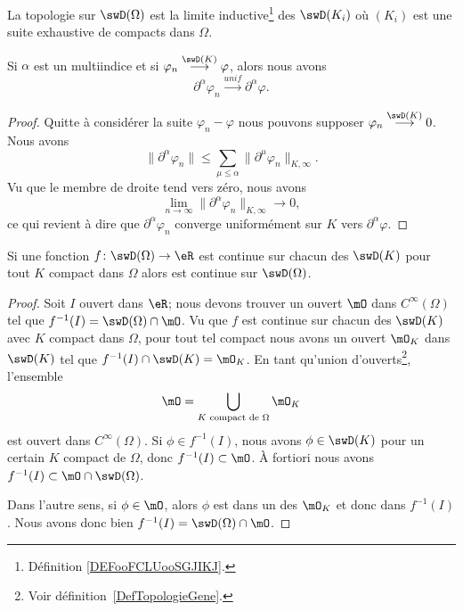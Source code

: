 \begin{proposition}
	La topologie sur \( \swD(\Omega)\) est la limite inductive\footnote{Définition \ref{DEFooFCLUooSGJIKJ}.} des \( \swD(K_i)\) où \( (K_i)\) est une suite exhaustive de compacts dans \( \Omega\).
\end{proposition}

\begin{lemma}    \label{LemXXwDjui}
	Si \( \alpha\) est un multiindice et si \( \varphi_n\stackrel{\swD(K)}{\longrightarrow}\varphi\), alors nous avons
	\begin{equation}
		\partial^{\alpha}\varphi_n\stackrel{unif}{\longrightarrow}\partial^{\alpha}\varphi.
	\end{equation}
\end{lemma}

\begin{proof}
	Quitte à considérer la suite \( \varphi_n-\varphi\) nous pouvons supposer \( \varphi_n\stackrel{\swD(K)}{\longrightarrow}0\). Nous avons
	\begin{equation}
		\| \partial^{\alpha}\varphi_n \|\leq \sum_{\mu\leq\alpha}\| \partial^{\mu}\varphi_n \|_{K,\infty}.
	\end{equation}
	Vu que le membre de droite tend vers zéro, nous avons
	\begin{equation}
		\lim_{n\to \infty} \| \partial^{\alpha}\varphi_n \|_{K,\infty}\to 0,
	\end{equation}
	ce qui revient à dire que \( \partial^{\alpha}\varphi_n\) converge uniformément sur \( K\) vers \( \partial^{\alpha}\varphi\).
\end{proof}

\begin{lemma}   \label{LemWEGpemo}
	Si une fonction \( f\colon \swD(\Omega)\to \eR\) est continue sur chacun des \( \swD(K)\) pour tout \( K\) compact dans \( \Omega\) alors est continue sur \( \swD(\Omega)\).
\end{lemma}

\begin{proof}
	Soit \( I\) ouvert dans \( \eR\); nous devons trouver un ouvert \( \mO\) dans \(  C^{\infty}(\Omega)\) tel que \( f^{-1}(I)=\swD(\Omega)\cap\mO\). Vu que \( f\) est continue sur chacun des \( \swD(K)\) avec \( K\) compact dans \( \Omega\), pour tout tel compact nous avons un ouvert \( \mO_K\) dans \( \swD(K)\) tel que \( f^{-1}(I)\cap \swD(K)=\mO_K\). En tant qu'union d'ouverts\footnote{Voir définition~\ref{DefTopologieGene}.}, l'ensemble
	\begin{equation}
		\mO=\bigcup_{ K\text{ compact de } \Omega}\mO_K
	\end{equation}
	est ouvert dans \(  C^{\infty}(\Omega)\). Si \( \phi\in f^{-1}(I)\), nous avons \( \phi\in\swD(K)\) pour un certain \( K\) compact de \( \Omega\), donc \( f^{-1}(I)\subset\mO\). À fortiori nous avons \( f^{-1}(I)\subset\mO\cap\swD(\Omega)\).

	Dans l'autre sens, si \( \phi\in\mO\), alors \( \phi\) est dans un des \( \mO_K\) et donc dans \( f^{-1}(I)\). Nous avons donc bien \( f^{-1}(I)=\swD(\Omega)\cap \mO\).
\end{proof}

